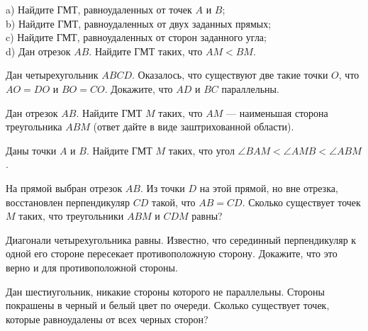 \begin{problems}

\item   a) Найдите ГМТ, равноудаленных от точек $A$ и $B$;\\
b) Найдите ГМТ, равноудаленных от двух заданных прямых;\\
c) Найдите ГМТ, равноудаленных от сторон заданного угла;\\
d) Дан отрезок $AB$. Найдите ГМТ таких, что $AM<BM$.


\item  Дан четырехугольник $ABCD$. Оказалось, что существуют две такие точки $O$, что $AO=DO$ и $BO=CO$. Докажите, что $AD$ и $BC$ параллельны.

\item  Дан отрезок $AB$.  Найдите ГМТ $M$ таких, что $AM$ --- наименьшая сторона треугольника $ABM$ (ответ дайте в виде заштрихованной области).

\item   Даны точки $A$ и $B$. Найдите ГМТ $M$ таких, что угол $ \angle BAM< \angle AMB < \angle ABM$.


\item   На прямой выбран отрезок $AB$. Из точки $D$ на этой прямой, но вне отрезка, восстановлен перпендикуляр $CD$ такой, что $AB=CD$. Сколько существует точек $M$ таких, что треугольники $ABM$ и $CDM$ равны?


\item   Диагонали четырехугольника равны. Известно, что серединный перпендикуляр к одной его стороне пересекает противоположную сторону. Докажите, что это верно и для противоположной стороны.

\item   Дан шестиугольник, никакие стороны которого не параллельны. Стороны покрашены в черный и белый цвет по очереди. Сколько существует точек, которые равноудалены от всех черных сторон?



\end{problems}
